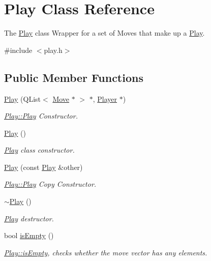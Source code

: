 \hypertarget{class_play}{\section{Play Class Reference}
\label{class_play}
}


The \hyperlink{class_play}{Play} class Wrapper for a set of Moves that make up a \hyperlink{class_play}{Play}.  




{\ttfamily \#include $<$play.\-h$>$}

\subsection*{Public Member Functions}
\begin{DoxyCompactItemize}
\item 
\hyperlink{class_play_a2dc24501b99a45769193fcb270505f0f}{Play} (Q\-List$<$ \hyperlink{class_move}{Move} $\ast$ $>$ $\ast$, \hyperlink{class_player}{Player} $\ast$)
\begin{DoxyCompactList}\small\item\em \hyperlink{class_play_a2dc24501b99a45769193fcb270505f0f}{Play\-::\-Play} Constructor. \end{DoxyCompactList}\item 
\hyperlink{class_play_a0088438837d29378e35a2beed04e64df}{Play} ()
\begin{DoxyCompactList}\small\item\em \hyperlink{class_play}{Play} class constructor. \end{DoxyCompactList}\item 
\hyperlink{class_play_aa0a6845d214673a3dc64d661027046b2}{Play} (const \hyperlink{class_play}{Play} \&other)
\begin{DoxyCompactList}\small\item\em \hyperlink{class_play_a2dc24501b99a45769193fcb270505f0f}{Play\-::\-Play} Copy Constructor. \end{DoxyCompactList}\item 
\hyperlink{class_play_a6f7dd4d097454caef2e81fa94fe739d5}{$\sim$\-Play} ()
\begin{DoxyCompactList}\small\item\em \hyperlink{class_play}{Play} destructor. \end{DoxyCompactList}\item 
bool \hyperlink{class_play_af3ee40c18a0e3fbf6e16f645b8de248b}{is\-Empty} ()
\begin{DoxyCompactList}\small\item\em \hyperlink{class_play_af3ee40c18a0e3fbf6e16f645b8de248b}{Play\-::is\-Empty}, checks whether the move vector has any elements. \end{DoxyCompactList}\item 

\end{DoxyCompactItemize}
